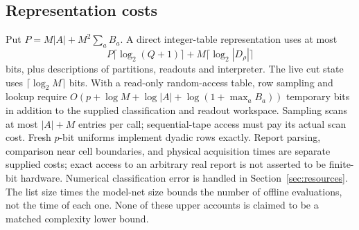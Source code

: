 \subsection{Representation costs}
Put $P=M|A|+M^2\sum_aB_a$. A direct integer-table representation uses at most
\[
 P\lceil\log_2(Q+1)\rceil+M\lceil\log_2|D_\rho|\rceil
\]
bits, plus descriptions of partitions, readouts and interpreter. The live cut state uses $\lceil\log_2M\rceil$ bits. With a read-only random-access table, row sampling and lookup require
$O(p+\log M+\log|A|+\log(1+\max_aB_a))$ temporary bits in addition to the supplied classification and readout workspace. Sampling scans at most $|A|+M$ entries per call; sequential-tape access must pay its actual scan cost. Fresh $p$-bit uniforms implement dyadic rows exactly. Report parsing, comparison near cell boundaries, and physical acquisition times are separate supplied costs; exact access to an arbitrary real report is not asserted to be finite-bit hardware. Numerical classification error is handled in Section~\ref{sec:resources}. The list size times the model-net size bounds the number of offline evaluations, not the time of each one. None of these upper accounts is claimed to be a matched complexity lower bound.
